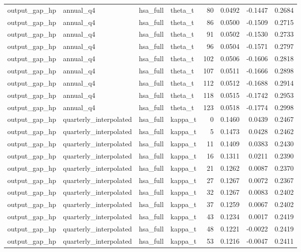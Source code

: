 \begin{tabular}{llllrrrr}
output\_gap\_hp & annual\_q4 & hsa\_full & theta\_t & 80 & 0.0492 & -0.1447 & 0.2684 \\
output\_gap\_hp & annual\_q4 & hsa\_full & theta\_t & 86 & 0.0500 & -0.1509 & 0.2715 \\
output\_gap\_hp & annual\_q4 & hsa\_full & theta\_t & 91 & 0.0502 & -0.1530 & 0.2733 \\
output\_gap\_hp & annual\_q4 & hsa\_full & theta\_t & 96 & 0.0504 & -0.1571 & 0.2797 \\
output\_gap\_hp & annual\_q4 & hsa\_full & theta\_t & 102 & 0.0506 & -0.1606 & 0.2818 \\
output\_gap\_hp & annual\_q4 & hsa\_full & theta\_t & 107 & 0.0511 & -0.1666 & 0.2898 \\
output\_gap\_hp & annual\_q4 & hsa\_full & theta\_t & 112 & 0.0512 & -0.1688 & 0.2914 \\
output\_gap\_hp & annual\_q4 & hsa\_full & theta\_t & 118 & 0.0515 & -0.1742 & 0.2953 \\
output\_gap\_hp & annual\_q4 & hsa\_full & theta\_t & 123 & 0.0518 & -0.1774 & 0.2998 \\
output\_gap\_hp & quarterly\_interpolated & hsa\_full & kappa\_t & 0 & 0.1460 & 0.0439 & 0.2467 \\
output\_gap\_hp & quarterly\_interpolated & hsa\_full & kappa\_t & 5 & 0.1473 & 0.0428 & 0.2462 \\
output\_gap\_hp & quarterly\_interpolated & hsa\_full & kappa\_t & 11 & 0.1409 & 0.0383 & 0.2430 \\
output\_gap\_hp & quarterly\_interpolated & hsa\_full & kappa\_t & 16 & 0.1311 & 0.0211 & 0.2390 \\
output\_gap\_hp & quarterly\_interpolated & hsa\_full & kappa\_t & 21 & 0.1262 & 0.0087 & 0.2370 \\
output\_gap\_hp & quarterly\_interpolated & hsa\_full & kappa\_t & 27 & 0.1267 & 0.0072 & 0.2367 \\
output\_gap\_hp & quarterly\_interpolated & hsa\_full & kappa\_t & 32 & 0.1267 & 0.0083 & 0.2402 \\
output\_gap\_hp & quarterly\_interpolated & hsa\_full & kappa\_t & 37 & 0.1259 & 0.0067 & 0.2402 \\
output\_gap\_hp & quarterly\_interpolated & hsa\_full & kappa\_t & 43 & 0.1234 & 0.0017 & 0.2419 \\
output\_gap\_hp & quarterly\_interpolated & hsa\_full & kappa\_t & 48 & 0.1221 & -0.0022 & 0.2419 \\
output\_gap\_hp & quarterly\_interpolated & hsa\_full & kappa\_t & 53 & 0.1216 & -0.0047 & 0.2411 \\

\end{tabular}
